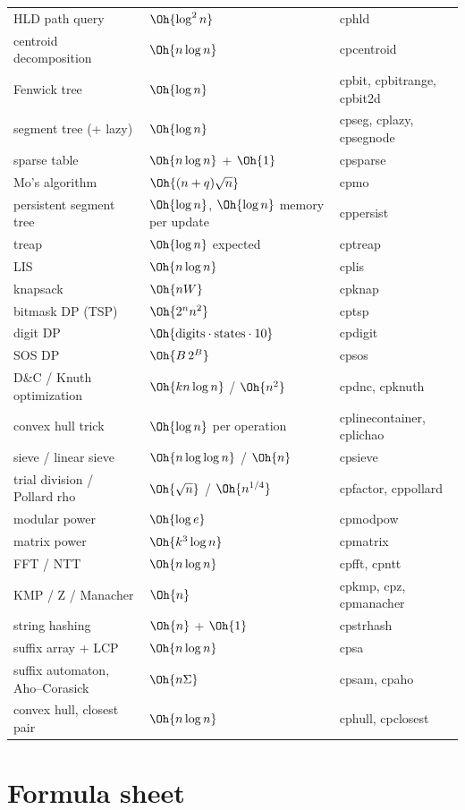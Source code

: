 \begin{small}
\begin{longtable}{>{\raggedright\arraybackslash}p{6cm}>{\raggedright\arraybackslash}p{4.4cm}>{\ttfamily}p{3.2cm}}
HLD path query & $\Oh{\log^2 n}$ & cphld \\
centroid decomposition & $\Oh{n\log n}$ & cpcentroid \\
Fenwick tree & $\Oh{\log n}$ & cpbit, cpbitrange, cpbit2d \\
segment tree (+ lazy) & $\Oh{\log n}$ & cpseg, cplazy, cpsegnode \\
sparse table & $\Oh{n\log n}$ + $\Oh{1}$ & cpsparse \\
Mo's algorithm & $\Oh{(n + q)\sqrt n}$ & cpmo \\
persistent segment tree & $\Oh{\log n}$, $\Oh{\log n}$ memory per update & cppersist \\
treap & $\Oh{\log n}$ expected & cptreap \\
LIS & $\Oh{n\log n}$ & cplis \\
knapsack & $\Oh{nW}$ & cpknap \\
bitmask DP (TSP) & $\Oh{2^n n^2}$ & cptsp \\
digit DP & $\Oh{\text{digits}\cdot\text{states}\cdot 10}$ & cpdigit \\
SOS DP & $\Oh{B\,2^B}$ & cpsos \\
D\&C / Knuth optimization & $\Oh{kn\log n}$ / $\Oh{n^2}$ & cpdnc, cpknuth \\
convex hull trick & $\Oh{\log n}$ per operation & cplinecontainer, cplichao \\
sieve / linear sieve & $\Oh{n\log\log n}$ / $\Oh{n}$ & cpsieve \\
trial division / Pollard rho & $\Oh{\sqrt n}$ / $\Oh{n^{1/4}}$ & cpfactor, cppollard \\
modular power & $\Oh{\log e}$ & cpmodpow \\
matrix power & $\Oh{k^3\log n}$ & cpmatrix \\
FFT / NTT & $\Oh{n\log n}$ & cpfft, cpntt \\
KMP / Z / Manacher & $\Oh{n}$ & cpkmp, cpz, cpmanacher \\
string hashing & $\Oh{n}$ + $\Oh{1}$ & cpstrhash \\
suffix array + LCP & $\Oh{n\log n}$ & cpsa \\
suffix automaton, Aho--Corasick & $\Oh{n\Sigma}$ & cpsam, cpaho \\
convex hull, closest pair & $\Oh{n\log n}$ & cphull, cpclosest \\
\end{longtable}
\end{small}

\section{Formula sheet}

